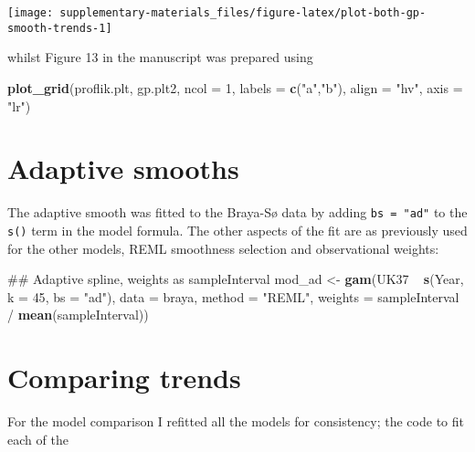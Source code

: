 \documentclass[12pt,]{article}
\newenvironment{Shaded}{\begin{snugshade}}{\end{snugshade}}
\newcommand{\KeywordTok}[1]{\textcolor[rgb]{0.13,0.29,0.53}{\textbf{{#1}}}}
\newcommand{\DataTypeTok}[1]{\textcolor[rgb]{0.13,0.29,0.53}{{#1}}}
\newcommand{\DecValTok}[1]{\textcolor[rgb]{0.00,0.00,0.81}{{#1}}}
\newcommand{\StringTok}[1]{\textcolor[rgb]{0.31,0.60,0.02}{{#1}}}
\newcommand{\NormalTok}[1]{{#1}}
\begin{document}
\begin{center}\texttt{[image: supplementary-materials\_files/figure-latex/plot-both-gp-smooth-trends-1]} \end{center}

whilst Figure 13 in the manuscript was prepared using

\begin{Shaded}
\begin{Highlighting}[]
\KeywordTok{plot_grid}\NormalTok{(proflik.plt, gp.plt2, }\DataTypeTok{ncol =} \DecValTok{1}\NormalTok{, }\DataTypeTok{labels =} \KeywordTok{c}\NormalTok{(}\StringTok{"a"}\NormalTok{,}\StringTok{"b"}\NormalTok{),}
          \DataTypeTok{align =} \StringTok{"hv"}\NormalTok{, }\DataTypeTok{axis =} \StringTok{"lr"}\NormalTok{)}
\end{Highlighting}
\end{Shaded}

\section{Adaptive smooths}\label{adaptive-smooths}

The adaptive smooth was fitted to the Braya-Sø data by adding
\texttt{bs\ =\ "ad"} to the \texttt{s()} term in the model formula. The
other aspects of the fit are as previously used for the other models,
REML smoothness selection and observational weights:

\begin{Shaded}
\begin{Highlighting}[]
\NormalTok{## Adaptive spline, weights as sampleInterval}
\NormalTok{mod_ad <-}\StringTok{ }\KeywordTok{gam}\NormalTok{(UK37 ~}\StringTok{ }\KeywordTok{s}\NormalTok{(Year, }\DataTypeTok{k =} \DecValTok{45}\NormalTok{, }\DataTypeTok{bs =} \StringTok{"ad"}\NormalTok{), }\DataTypeTok{data =} \NormalTok{braya,}
              \DataTypeTok{method =} \StringTok{"REML"}\NormalTok{,}
              \DataTypeTok{weights =} \NormalTok{sampleInterval /}\StringTok{ }\KeywordTok{mean}\NormalTok{(sampleInterval))}
\end{Highlighting}
\end{Shaded}

\section{Comparing trends}\label{comparing-trends}

For the model comparison I refitted all the models for consistency; the
code to fit each of the
\end{document}
